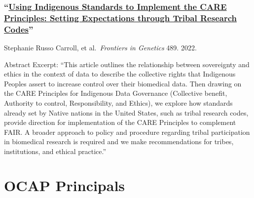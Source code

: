 \documentclass[
]{book}
\begin{document}
\hypertarget{using-indigenous-standards-to-implement-the-care-principles-setting-expectations-through-tribal-research-codes}{%
\subsubsection*{\texorpdfstring{``\href{https://www.frontiersin.org/articles/10.3389/fgene.2022.823309/full?\&utm_source=Email_to_authors_\&utm_medium=Email\&utm_content=T1_11.5e1_author\&utm_campaign=Email_publication\&field=\&journalName=Frontiers_in_Genetics\&id=823309}{Using Indigenous Standards to Implement the CARE Principles: Setting Expectations through Tribal Research Codes}''}{``Using Indigenous Standards to Implement the CARE Principles: Setting Expectations through Tribal Research Codes''}}\label{using-indigenous-standards-to-implement-the-care-principles-setting-expectations-through-tribal-research-codes}}

Stephanie Russo Carroll, et al.~\emph{Frontiers in Genetics} 489. 2022.

Abstract Excerpt: ``This article outlines the relationship between sovereignty and ethics in the context of data to describe the collective rights that Indigenous Peoples assert to increase control over their biomedical data. Then drawing on the CARE Principles for Indigenous Data Governance (Collective benefit, Authority to control, Responsibility, and Ethics), we explore how standards already set by Native nations in the United States, such as tribal research codes, provide direction for implementation of the CARE Principles to complement FAIR. A broader approach to policy and procedure regarding tribal participation in biomedical research is required and we make recommendations for tribes, institutions, and ethical practice.''

\hypertarget{ocap-principals}{%
\section{OCAP Principals}\label{ocap-principals}}
\end{document}
